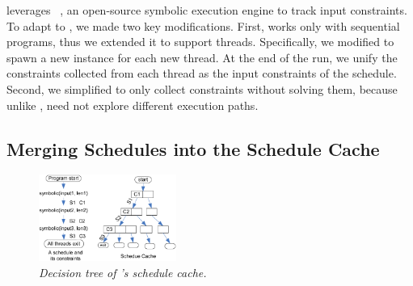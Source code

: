 \tern leverages \klee~\cite{klee:osdi08}, an open-source symbolic execution
engine to track input constraints.  To adapt \klee to \tern, we made two key
modifications.  First, \klee works only with sequential programs, thus we
extended it to support threads.  Specifically, we modified \klee to spawn a
new \klee instance for each new thread.  At the end of the run, we unify
the constraints collected from each thread as the input constraints of the
schedule.  Second, we simplified \klee to only collect constraints without
solving them, because unlike \klee, \tern need not explore different
execution paths.





\subsection{Merging Schedules into the Schedule Cache} \label{sec:schedule-cache}

\begin{figure}[t]
\begin{center}
\includegraphics[width=0.4\textwidth]{tern/figures/cache.eps}
\end{center}
\caption{\emph{Decision tree of \tern's schedule cache.}}
\label{fig:schedule-tree}
\end{figure}


